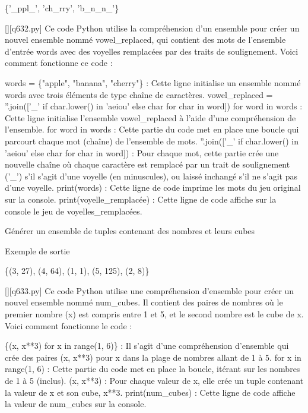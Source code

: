 \{'\_ppl\_', 'ch\_rry', 'b\_n\_n\_'\}
        \par
        \begin{solution}
            \renewcommand{\nomfichier}{q632.py}
            \pythonfile{\chemincode \nomfichier}[][\nomfichier]
            Ce code Python utilise la compréhension d'un ensemble pour créer un nouvel ensemble nommé vowel\_replaced, qui contient des mots de l'ensemble d'entrée words avec des voyelles remplacées par des traits de soulignement. Voici comment fonctionne ce code :

    words = \{"apple", "banana", "cherry"\} : Cette ligne initialise un ensemble nommé words avec trois éléments de type chaîne de caractères.
    vowel\_replaced = {''.join(['\_' if char.lower() in 'aeiou' else char for char in word]) for word in words} : Cette ligne initialise l'ensemble vowel\_replaced à l'aide d'une compréhension de l'ensemble.
        for word in words : Cette partie du code met en place une boucle qui parcourt chaque mot (chaîne) de l'ensemble de mots.
        ''.join(['\_' if char.lower() in 'aeiou' else char for char in word]) : Pour chaque mot, cette partie crée une nouvelle chaîne où chaque caractère est remplacé par un trait de soulignement ('\_') s'il s'agit d'une voyelle (en minuscules), ou laissé inchangé s'il ne s'agit pas d'une voyelle.
    print(words) : Cette ligne de code imprime les mots du jeu original sur la console.
    print(voyelle\_remplacée) : Cette ligne de code affiche sur la console le jeu de voyelles\_remplacées.
        \end{solution}
        

        \question
        Générer un ensemble de tuples contenant des nombres et leurs cubes

Exemple de sortie

\{(3, 27), (4, 64), (1, 1), (5, 125), (2, 8)\}
        \par
        \begin{solution}
            \renewcommand{\nomfichier}{q633.py}
            \pythonfile{\chemincode \nomfichier}[][\nomfichier]
            Ce code Python utilise une compréhension d'ensemble pour créer un nouvel ensemble nommé num\_cubes. Il contient des paires de nombres où le premier nombre (x) est compris entre 1 et 5, et le second nombre est le cube de x. Voici comment fonctionne le code :

    \{(x, x**3) for x in range(1, 6)\} : Il s'agit d'une compréhension d'ensemble qui crée des paires (x, x**3) pour x dans la plage de nombres allant de 1 à 5.
        for x in range(1, 6) : Cette partie du code met en place la boucle, itérant sur les nombres de 1 à 5 (inclus).
        (x, x**3) : Pour chaque valeur de x, elle crée un tuple contenant la valeur de x et son cube, x**3.
    print(num\_cubes) : Cette ligne de code affiche la valeur de num\_cubes sur la console.
        \end{solution}
        

